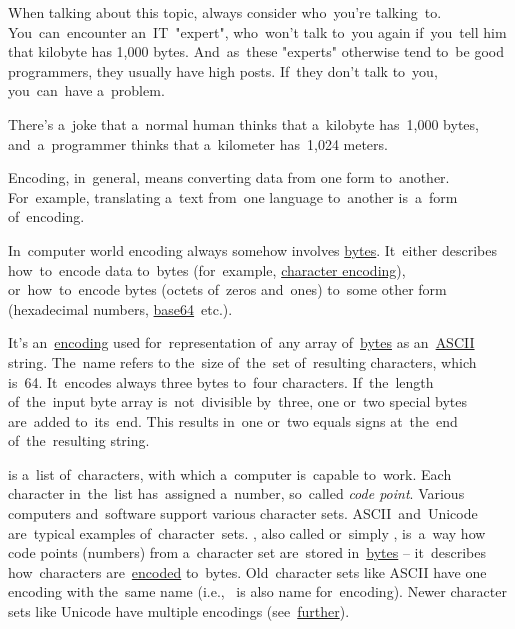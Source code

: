 When talking about this topic, always consider who~you're talking~to.
You~can~encounter an~IT~"expert", who~won't talk to~you again if~you~tell him that kilobyte has 1,000 bytes.
And~as~these "experts" otherwise tend to~be good programmers, they usually have high posts.
If~they don't talk to~you, you~can~have a~problem.

There's a~joke that a~normal human thinks that a~kilobyte has~1,000 bytes, and~a~programmer thinks that a~kilometer has~1,024 meters.

\label{encoding}
Encoding, in~general, means converting data from one form to~another.
For~example, translating a~text from~one language to~another is~a~form of~encoding.

In~computer world encoding always somehow involves \hyperref[bitsandbytes]{bytes}.
It~either describes how~to~encode data to~bytes (for~example, \hyperref[charactersetencoding]{character encoding}), or~how~to~encode bytes (octets of~zeros and~ones) to~some other form (hexadecimal numbers, \hyperref[base64]{base64}~etc.).

\label{base64}
It's an~\hyperref[encoding]{encoding} used for~representation of~any array of~\hyperref[bitsandbytes]{bytes} as an~\hyperref[ascii]{ASCII} string.
The~name refers to the~size of~the~set of~resulting characters, which is~64.
It~encodes always three bytes to~four characters.
If~the~length of~the~input byte array is~not~divisible by~three, one or~two special bytes are~added to~its~end.
This results in~one or~two equals signs at~the~end of~the~resulting string.
\newpage

\label{charactersetencoding}
\begin{itemize}
     is a~list of~characters, with which a~computer is~capable to~work.
            Each character in~the~list has~assigned a~number, so~called \textit{code point}.
            Various computers and~software support various character sets.
            \mbox{ASCII and Unicode} are~typical examples of~character~sets.
    , also called  or~simply , is~a~way how code points (numbers) from a~character set are~stored in~\hyperref[bitsandbytes]{bytes} -- it~describes how~characters are~\hyperref[encoding]{encoded} to~bytes.
            Old~character sets like ASCII have one encoding with the~same name (i.e.,~ is also name for~encoding).
            Newer character sets like Unicode have multiple encodings (see~\hyperref[utf]{further}).
\end{itemize}

